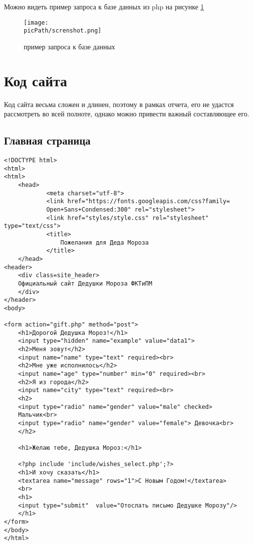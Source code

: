 \documentclass[oneside,final,14pt]{extreport}
\newcommand{\picPath}{pictures}
\begin{document}
Можно видеть пример запроса к базе данных из php на рисунке \ref{screnshot}

\begin{figure}[H]
\centering
	\texttt{[image: \\picPath/screnshot.png]}
	\caption{ пример запроса к базе данных }
  	\label{screnshot}

\end{figure}

\chapter{Код сайта}

Код сайта весьма сложен и длинен, поэтому в рамках отчета, его не удастся рассмотреть во всей полноте, однако можно привести важный составляющее его.

\section{Главная страница}

\begin{verbatim}
<!DOCTYPE html>
<html>
<html>
	<head>
			<meta charset="utf-8">
			<link href="https://fonts.googleapis.com/css?family=
			Open+Sans+Condensed:300" rel="stylesheet">
			<link href="styles/style.css" rel="stylesheet" type="text/css">
			<title>
				Пожелания для Деда Мороза
			</title>	
	</head>
<header>
	<div class=site_header>
	Официальный сайт Дедушки Мороза ФКТиПМ
	</div>
</header>	
<body>

<form action="gift.php" method="post">
	<h1>Дорогой Дедушка Мороз!</h1>
	<input type="hidden" name="example" value="data1">
	<h2>Меня зовут</h2>
	<input name="name" type="text" required><br>
	<h2>Мне уже исполнилось</h2>
	<input name="age" type="number" min="0" required><br>
	<h2>Я из города</h2>
	<input name="city" type="text" required><br>
	<h2>
  	<input type="radio" name="gender" value="male" checked> 
  	Мальчик<br>
 	<input type="radio" name="gender" value="female"> Девочка<br>
	</h2>

	<h1>Желаю тебе, Дедушка Мороз:</h1>

	<?php include 'include/wishes_select.php';?>
	<h1>И хочу сказать</h1>
	<textarea name="message" rows="1">С Новым Годом!</textarea>
	<br>
	<h1>
	<input type="submit"  value="Отослать письмо Дедушке Морозу"/> 
	</h1>
</form>
</body>
</html>
\end{verbatim}
\end{document}
